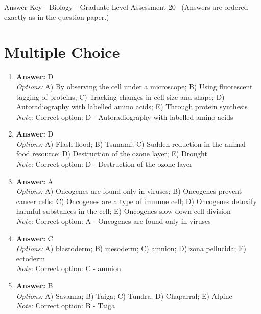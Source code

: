 \documentclass[12pt]{article}
\begin{document}
\begin{center}
Answer Key - Biology - Graduate Level Assessment 20 \
\small (Answers are ordered exactly as in the question paper.)
\end{center}

\section*{Multiple Choice}
\begin{enumerate}[label=\arabic*.]
\item \textbf{Answer:} D
\\ \textit{Options:} A) By observing the cell under a microscope; B) Using fluorescent tagging of proteins; C) Tracking changes in cell size and shape; D) Autoradiography with labelled amino acids; E) Through protein synthesis
\\ \textit{Note:} Correct option: D - Autoradiography with labelled amino acids
\item \textbf{Answer:} D
\\ \textit{Options:} A) Flash flood; B) Tsunami; C) Sudden reduction in the animal food resource; D) Destruction of the ozone layer; E) Drought
\\ \textit{Note:} Correct option: D - Destruction of the ozone layer
\item \textbf{Answer:} A
\\ \textit{Options:} A) Oncogenes are found only in viruses; B) Oncogenes prevent cancer cells; C) Oncogenes are a type of immune cell; D) Oncogenes detoxify harmful substances in the cell; E) Oncogenes slow down cell division
\\ \textit{Note:} Correct option: A - Oncogenes are found only in viruses
\item \textbf{Answer:} C
\\ \textit{Options:} A) blastoderm; B) mesoderm; C) amnion; D) zona pellucida; E) ectoderm
\\ \textit{Note:} Correct option: C - amnion
\item \textbf{Answer:} B
\\ \textit{Options:} A) Savanna; B) Taiga; C) Tundra; D) Chaparral; E) Alpine
\\ \textit{Note:} Correct option: B - Taiga
\end{enumerate}
\end{document}
